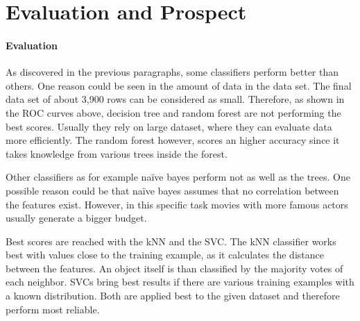 \section{Evaluation and Prospect}
\paragraph{Evaluation}

\label{cha:prospect}

As discovered in the previous paragraphs, some classifiers perform better than others. One reason could be seen in the amount of data in the data set. The final data set of about 3,900 rows can be considered as small. Therefore, as shown in the ROC curves above, decision tree and random forest are not performing the best scores. Usually they rely on large dataset, where they can evaluate data more efficiently. The random forest however, scores an higher accuracy since it takes knowledge from various trees inside the forest.



Other classifiers as for example na\"{i}ve bayes perform not as well as the trees. One possible reason could be that na\"{i}ve bayes assumes that no correlation between the features exist. However, in this specific task movies with more famous actors usually generate a bigger budget. 

Best scores are reached with the kNN and the SVC. The kNN classifier works best with values close to the training example, as it calculates the distance between the features. An object itself is than classified by the majority votes of each neighbor.
SVCs bring best results if there are various training examples with a known distribution. Both are applied best to the given dataset and therefore perform most reliable.








